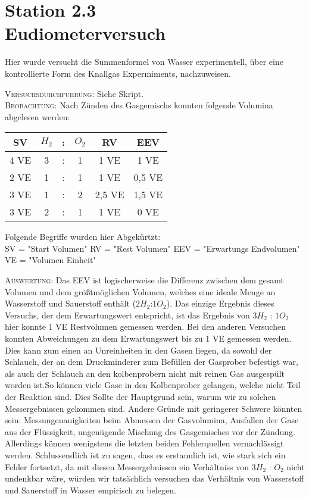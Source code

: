\documentclass[11pt, a4paper]{article}
\begin{document}
\section*{Station 2.3\\Eudiometerversuch}

Hier wurde versucht die Summenformel von Wasser experimentell, über eine kontrollierte Form des Knallgas Expermiments, nachzuweisen.



\textsc{Versuchsdurchführung:} Siehe Skript.\\

\textsc{Beobachtung:}\hspace{5mm} Nach Zünden des Gasgemischs konnten folgende Volumina abgelesen werden:\\
	\begin{center}		
	\begin{tabular}{c|ccc|cc}
	SV & $H_2$ & : & $O_2$ & RV & EEV\\ 
	\hline
	4 VE & 3 & : & 1 & 1 VE & 1 VE \\
	2 VE & 1 & : & 1 & 1 VE & 0,5 VE \\
	3 VE & 1 & : & 2 & 2,5 VE & 1,5 VE \\
	3 VE & 2 & : & 1 & 1 VE & 0 VE\\ 
	\end{tabular}
	\end{center}
Folgende Begriffe wurden hier Abgekürtzt:\\
SV = "Start Volumen" RV = "Rest Volumen" EEV = "Erwartungs Endvolumen" VE = "Volumen Einheit"

\textsc{Auswertung:}\hspace{8mm} Das EEV ist logischerweise die Differenz zwischen dem gesamt Volumen und dem größtmöglichen Volumen, welches eine ideale Menge an Wasserstoff und Sauerstoff enthält ($2H_2$:$1O_2$). Das einzige Ergebnis dieses Versuchs, der dem Erwartungswert entspricht, ist das Ergebnis von $3H_2$ : $1O_2$ hier konnte 1 VE Restvolumen gemessen werden. Bei den anderen Versuchen konnten Abweichungen zu dem Erwartungswert bis zu 1 VE gemessen werden. Dies kann zum einen an Unreinheiten in den Gasen liegen, da sowohl der Schlauch, der an dem Druckminderer zum Befüllen der Gasprober befestigt war, als auch der Schlauch an den kolbenprobern nicht mit reinen Gas ausgespült worden ist.So können viele Gase in den Kolbenprober gelangen, welche nicht Teil der Reaktion sind. Dies Sollte der Hauptgrund sein, warum wir zu solchen Messergebnissen gekommen sind. Andere Gründe mit geringerer Schwere könnten sein: Messungenauigkeiten beim Abmessen der Gasvolumina, Ausfallen der Gase aus der Flüssigkeit, ungenügende Mischung des Gasgemisches vor der Zündung. Allerdings können wenigstens die letzten beiden Fehlerquellen vernachlässigt werden. Schlussendlich ist zu sagen, dass es erstaunlich ist, wie stark sich ein Fehler fortsetzt, da mit diesen Messergebnissen ein Verhältniss von $3H_2$ : $O_2$ nicht undenkbar wäre, würden wir tatsächlich versuchen das Verhältnis von Wasserstoff und Sauerstoff in Wasser empirisch zu belegen.
\end{document}
